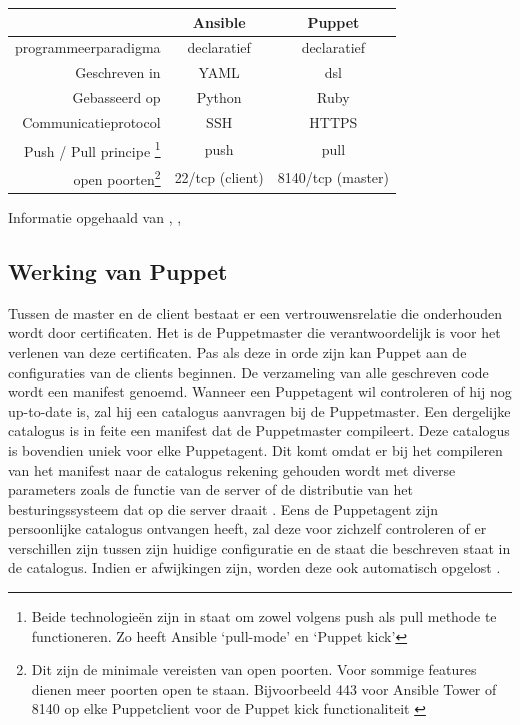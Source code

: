 \begin{minipage}{15cm}
\begin{tabular}{ r |c c }
& \textbf{Ansible} & \textbf{Puppet} \\
  \hline	  		
\gls{programmeerparadigma}  & declaratief & declaratief  \\
\hline
Geschreven in & YAML & \gls{dsl}  \\
\hline
Gebasseerd op & Python & Ruby \\
\hline
Communicatieprotocol & SSH & HTTPS \\

\hline
  Push / Pull principe \footnote{Beide technologie\"en zijn in staat om zowel volgens push als pull methode te functioneren. Zo heeft Ansible ‘pull-mode' \autocite{ansiblePull} en \textcite{puppetkick} ‘Puppet kick' } & \gls{push} & \gls{pull} \\
   \hline
   open poorten\footnote{Dit zijn de minimale vereisten van open poorten. Voor sommige features dienen meer poorten open te staan. Bijvoorbeeld 443 voor Ansible Tower of 8140 op elke Puppetclient voor de Puppet kick functionaliteit \autocite{puppetkick} }  & 22/tcp (client) & 8140/tcp (master)\\
  \end{tabular}
  \end{minipage}   

 Informatie opgehaald van \textcite{languagePuppet}, \textcite{masterproef}, \textcite{ansibledoc}



\subsection{Werking van Puppet}

Tussen de master en de client bestaat er een vertrouwensrelatie die onderhouden wordt door certificaten. Het is de Puppetmaster die verantwoordelijk is voor het verlenen van deze certificaten. Pas als deze in orde zijn kan Puppet  aan de configuraties van de clients beginnen. De verzameling van alle geschreven code wordt een manifest genoemd. Wanneer een Puppetagent wil controleren of hij nog up-to-date is, zal hij een catalogus aanvragen bij de Puppetmaster. Een dergelijke catalogus is in feite een manifest dat de Puppetmaster compileert. Deze catalogus is bovendien uniek voor elke Puppetagent. Dit komt omdat er bij het compileren van het manifest naar de catalogus rekening gehouden wordt met diverse parameters zoals de functie van de server of de distributie van het besturingssysteem dat op die server draait \autocite{Puppetlanguagecatalog}. Eens de Puppetagent zijn persoonlijke catalogus ontvangen heeft, zal deze voor zichzelf controleren of er verschillen zijn tussen zijn huidige configuratie en de staat die beschreven staat in de catalogus. Indien er afwijkingen zijn, worden deze ook automatisch opgelost \autocite{puppetdoc}.

